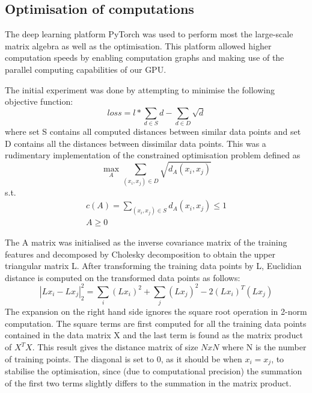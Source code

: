 \documentclass[10pt,technote]{IEEEtran}
\begin{document}
\appendix
\begin{appendices}
\chapter{Optimisation of computations}

The deep learning platform PyTorch was used to perform most the large-scale matrix algebra as well as the optimisation. This platform allowed higher computation speeds by enabling computation graphs and making use of the parallel computing capabilities of our GPU.

\end{appendices}
The initial experiment was done by attempting to minimise the following objective function: \begin{equation}
    loss = l*\sum_{d \in S}d -  \sum_{d \in D}\sqrt{d}
\end{equation}
where set S contains all computed distances between similar data points and set D contains all the distances between dissimilar data points. This was a rudimentary implementation of the constrained optimisation problem defined as
\begin{equation}
    \max_{A}\sum_{(x_i, x_j) \in D}\sqrt{d_A (x_i, x_j)}
\end{equation}
s.t.
\begin{equation}
    \begin{aligned}
        c(A) = \sum_{(x_i, x_j) \in S}d_A (x_i, x_j) \le 1 \\
        A \ge 0
    \end{aligned}
\end{equation}

The A matrix was initialised as the 
inverse covariance matrix of the training features and decomposed by Cholesky decomposition to obtain the upper triangular matrix L. After transforming the training data points by L, Euclidian distance is computed on the transformed data points as follows:
\begin{equation}
    |Lx_i - Lx_j|_2^2 = \sum_{i}(Lx_i)^2 + \sum_{j}(Lx_j)^2 - 2(Lx_i)^T(Lx_j)
\end{equation}
The expansion on the right hand side ignores the square root operation in 2-norm computation. The square terms are first computed for all the training data points contained in the data matrix X and the last term is found as the matrix product of $X^TX$. This result gives the distance matrix of size $NxN$ where N is the number of training points. The diagonal is set to 0, as it should be when $x_i = x_j$, to stabilise the optimisation, since (due to computational precision) the summation of the first two terms slightly differs to the summation in the matrix product. 



\end{document}
